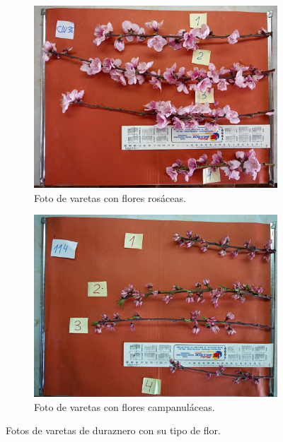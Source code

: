 \begin{figure}[ht]
     \centering
     \begin{subfigure}[b]{0.3\textwidth}
         \centering
         \includegraphics[scale=.13]{./Figures/flor_rosacea.jpg}
         \caption{Foto de varetas con flores rosáceas.}
         \label{fig:1de23}
     \end{subfigure}
     \hfill
     \begin{subfigure}[b]{0.45\textwidth}
         \centering
         \includegraphics[scale=.13]{./Figures/flor_camp.jpg}
         \caption{Foto de varetas con flores campanuláceas.}
         \label{fig:2de23}
     \end{subfigure}
        \caption{Fotos de varetas de duraznero con su tipo de flor.}
        \label{fig:two graphs}
\end{figure}

